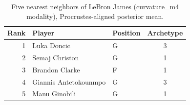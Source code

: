 \begin{table}[htbp]
  \centering\small
  \begin{tabular}{rllc}
    \toprule
    Rank & Player & Position & Archetype \\
    \midrule
    1 & Luka Doncic & G & 3 \\
    2 & Semaj Christon & G & 1 \\
    3 & Brandon Clarke & F & 1 \\
    4 & Giannis Antetokounmpo & G & 3 \\
    5 & Manu Ginobili & G & 1 \\
    \bottomrule
  \end{tabular}
  \caption{Five nearest neighbors of LeBron James (curvature_m4 modality), Procrustes-aligned posterior mean.}
  \label{tab:LeBron_James_neighbors_curvature_m4}
\end{table}

